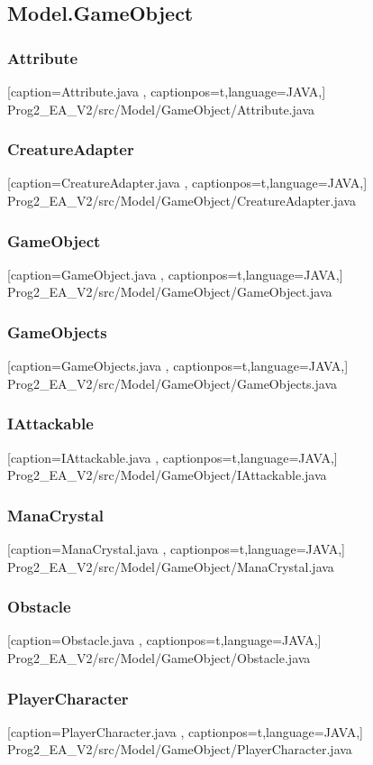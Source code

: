 \documentclass[a4paper,12pt]{scrartcl}
\begin{document}
	\subsection{Model.GameObject}
	\subsubsection{Attribute}
	
	[caption={Attribute.java}
	\label{lst:javaclass},
	captionpos=t,language=JAVA,]
	{Prog2_EA_V2/src/Model/GameObject/Attribute.java}
	\subsubsection{CreatureAdapter}
	
	[caption={CreatureAdapter.java}
	\label{lst:javaclass},
	captionpos=t,language=JAVA,]
	{Prog2_EA_V2/src/Model/GameObject/CreatureAdapter.java}
	\subsubsection{GameObject}
	
	[caption={GameObject.java}
	\label{lst:javaclass},
	captionpos=t,language=JAVA,]
	{Prog2_EA_V2/src/Model/GameObject/GameObject.java}
	\subsubsection{GameObjects}
	
	[caption={GameObjects.java}
	\label{lst:javaclass},
	captionpos=t,language=JAVA,]
	{Prog2_EA_V2/src/Model/GameObject/GameObjects.java}
	\subsubsection{IAttackable}
	
	[caption={IAttackable.java}
	\label{lst:javaclass},
	captionpos=t,language=JAVA,]
	{Prog2_EA_V2/src/Model/GameObject/IAttackable.java}
	\subsubsection{ManaCrystal}
	
	[caption={ManaCrystal.java}
	\label{lst:javaclass},
	captionpos=t,language=JAVA,]
	{Prog2_EA_V2/src/Model/GameObject/ManaCrystal.java}
	\subsubsection{Obstacle}
	
	[caption={Obstacle.java}
	\label{lst:javaclass},
	captionpos=t,language=JAVA,]
	{Prog2_EA_V2/src/Model/GameObject/Obstacle.java}
	\subsubsection{PlayerCharacter}
	
	[caption={PlayerCharacter.java}
	\label{lst:javaclass},
	captionpos=t,language=JAVA,]
	{Prog2_EA_V2/src/Model/GameObject/PlayerCharacter.java}
\end{document}
